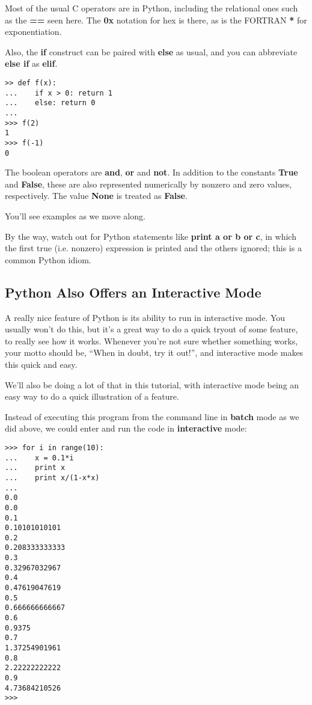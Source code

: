Most of the usual C operators are in Python, including the relational
ones such as the {\bf ==} seen here.  The {\bf 0x} notation for hex is
there, as is the FORTRAN {\bf **} for exponentiation.  

Also, the {\bf if} construct can be paired with {\bf else} as usual, and
you can abbreviate {\bf else if} as {\bf elif}.  

\begin{Verbatim}[fontsize=\relsize{-2}]
>> def f(x):
...    if x > 0: return 1
...    else: return 0
...
>>> f(2)
1
>>> f(-1)
0
\end{Verbatim}

The boolean operators are {\bf and}, {\bf or} and {\bf not}.  In
addition to the constants {\bf True} and {\bf False}, these are also
represented numerically by nonzero and zero values, respectively.  The
value {\bf None} is treated as {\bf False}.

You'll see examples as we move along.  

By the way, watch out for Python statements like {\bf print a or b or
c}, in which the first true (i.e. nonzero) expression is printed and the
others ignored; this is a common Python idiom.

\subsection{Python Also Offers an Interactive Mode}
\label{interactive}

A really nice feature of Python is its ability to run in interactive
mode.  You usually won't do this, but it's a great way to do a quick
tryout of some feature, to really see how it works.  Whenever you're not
sure whether something works, your motto should be, ``When in doubt, try
it out!'', and interactive mode makes this quick and easy.

We'll also be doing a lot of that in this tutorial, with interactive
mode being an easy way to do a quick illustration of a feature. 

Instead of executing this program from the command line in {\bf batch}
mode as we did above, we could enter and run the code in {\bf
interactive} mode:

\begin{Verbatim}[fontsize=\relsize{-2}]
% python
>>> for i in range(10):
...    x = 0.1*i
...    print x
...    print x/(1-x*x)
... 
0.0
0.0
0.1
0.10101010101
0.2
0.208333333333
0.3
0.32967032967
0.4
0.47619047619
0.5
0.666666666667
0.6
0.9375
0.7
1.37254901961
0.8
2.22222222222
0.9
4.73684210526
>>> 
\end{Verbatim}


